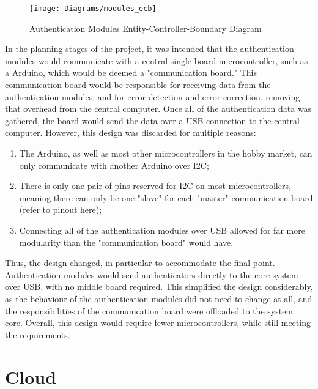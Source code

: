 \documentclass[12pt]{report}
\let\Oldsection\section
\renewcommand{\section}{\FloatBarrier\Oldsection}
\begin{document}
\begin{figure}
    \texttt{[image: Diagrams/modules\_ecb]}
    \caption{Authentication Modules Entity-Controller-Boundary Diagram}
    \label{fig:modules-ecb}
\end{figure}

In the planning stages of the project, it was intended that the authentication modules would communicate with a central 
single-board microcontroller, such as a Arduino, which would be deemed a "communication board." This communication board
would be responsible for receiving data from the authentication modules, and for error detection and error correction, 
removing that overhead from the central computer. Once all of the authentication data was gathered, the board would send 
the data over a USB connection to the central computer. However, this design was discarded for multiple reasons:
\begin{enumerate}
    \item The Arduino, as well as most other microcontrollers in the hobby market, can only communicate with another 
    Arduino over I2C;
    \item There is only one pair of pins reserved for I2C on most microcontrollers, meaning there can only be one 
    "slave" for each "master" communication board (refer to pinout here);
    \item Connecting all of the authentication modules over USB allowed for far more modularity than the "communication
    board" would have.
\end{enumerate}

Thus, the design changed, in particular to accommodate the final point. Authentication modules would send 
authenticators directly to the core system over USB, with no middle board required. This simplified the design 
considerably, as the behaviour of the authentication modules did not need to change at all, and the responsibilities 
of the communication board were offloaded to the system core. Overall, this design would require fewer 
microcontrollers, while still meeting the requirements.


\section{Cloud} \label{cloud}

\end{document}
